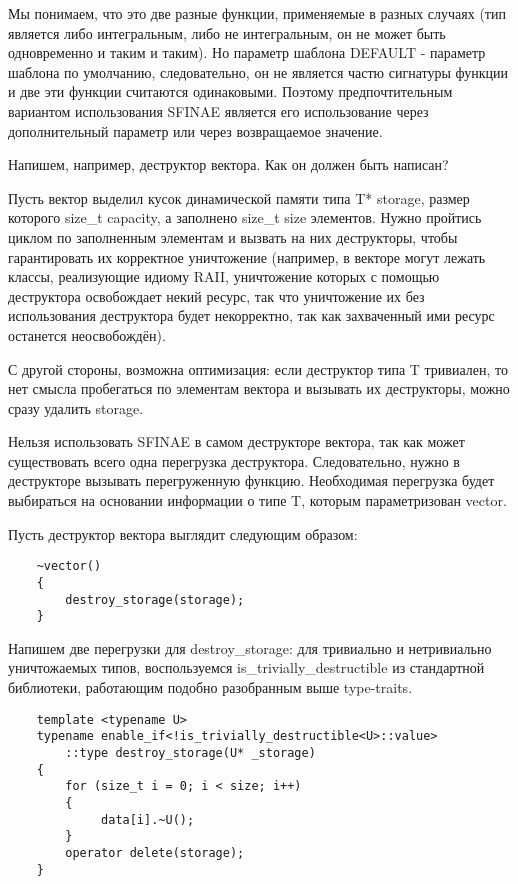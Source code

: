 	Мы понимаем, что это две разные функции, применяемые в разных случаях (тип является либо интегральным, либо не интегральным, он не может быть одновременно и таким и таким). Но параметр шаблона DEFAULT - параметр шаблона по умолчанию, следовательно, он не является частю сигнатуры функции и две эти функции считаются одинаковыми. Поэтому предпочтительным вариантом использования SFINAE является его использование через дополнительный параметр или через возвращаемое значение.
	
	\vspace{\baselineskip}	
	
	Напишем, например, деструктор вектора. Как он должен быть написан? 
	
	Пусть вектор выделил кусок динамической памяти типа T* storage, размер которого size\_t capacity, а заполнено size\_t size элементов. Нужно пройтись циклом по заполненным элементам и вызвать на них деструкторы, чтобы гарантировать их корректное уничтожение (например, в векторе могут лежать классы, реализующие идиому RAII, уничтожение которых с помощью деструктора освобождает некий ресурс, так что уничтожение их без использования деструктора будет некорректно, так как захваченный ими ресурс останется неосвобождён).
	
	 С другой стороны, возможна оптимизация: если деструктор типа T тривиален, то нет смысла пробегаться по элементам вектора и вызывать их деструкторы, можно сразу удалить storage.
	 
	 Нельзя использовать SFINAE в самом деструкторе вектора, так как может существовать всего одна перегрузка деструктора. Следовательно, нужно в деструкторе вызывать перегруженную функцию. Необходимая перегрузка будет выбираться на основании информации о типе T, которым параметризован vector.
	 
	 Пусть деструктор вектора выглядит следующим образом:

	\begin{verbatim}
	~vector()
	{
	    destroy_storage(storage);
	}
	\end{verbatim}
	
	Напишем две перегрузки для destroy\_storage: для тривиально и нетривиально уничтожаемых типов, воспользуемся is\_trivially\_destructible из стандартной библиотеки, работающим подобно разобранным выше type-traits.
	
	\begin{verbatim}
	template <typename U>
	typename enable_if<!is_trivially_destructible<U>::value>
	    ::type destroy_storage(U* _storage)
	{
	    for (size_t i = 0; i < size; i++)
	    {
	         data[i].~U();
	    }
	    operator delete(storage);
	}
	\end{verbatim}
	
